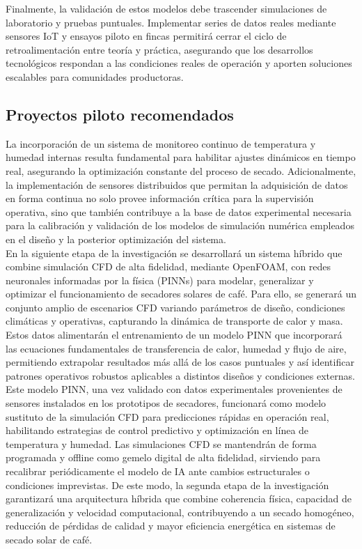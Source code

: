 \documentclass[12pt]{article}
\begin{document}
Finalmente, la validación de estos modelos debe trascender simulaciones de laboratorio y pruebas puntuales. Implementar series de datos reales mediante sensores IoT y ensayos piloto en fincas permitirá cerrar el ciclo de retroalimentación entre teoría y práctica, asegurando que los desarrollos tecnológicos respondan a las condiciones reales de operación y aporten soluciones escalables para comunidades productoras.




\subsection{Proyectos piloto recomendados}


La incorporación de un sistema de monitoreo continuo de temperatura y humedad internas resulta fundamental para habilitar ajustes dinámicos en tiempo real, asegurando la optimización constante del proceso de secado. Adicionalmente, la implementación de sensores distribuidos que permitan la adquisición de datos en forma continua no solo provee información crítica para la supervisión operativa, sino que también contribuye a la base de datos experimental necesaria para la calibración y validación de los modelos de simulación numérica empleados en el diseño y la posterior optimización del sistema.\\

En la siguiente etapa de la investigación se desarrollará un sistema híbrido que combine simulación CFD de alta fidelidad, mediante OpenFOAM, con redes neuronales informadas por la física (PINNs) para modelar, generalizar y optimizar el funcionamiento de secadores solares de café. Para ello, se generará un conjunto amplio de escenarios CFD variando parámetros de diseño, condiciones climáticas y operativas, capturando la dinámica de transporte de calor y masa. Estos datos alimentarán el entrenamiento de un modelo PINN que incorporará las ecuaciones fundamentales de transferencia de calor, humedad y flujo de aire, permitiendo extrapolar resultados más allá de los casos puntuales y así identificar patrones operativos robustos aplicables a distintos diseños y condiciones externas.\\

Este modelo PINN, una vez validado con datos experimentales provenientes de sensores instalados en los prototipos de secadores, funcionará como modelo sustituto de la simulación CFD para predicciones rápidas en operación real, habilitando estrategias de control predictivo y optimización en línea de temperatura y humedad. Las simulaciones CFD se mantendrán de forma programada y offline como gemelo digital de alta fidelidad, sirviendo para recalibrar periódicamente el modelo de IA ante cambios estructurales o condiciones imprevistas. De este modo, la segunda etapa de la investigación garantizará una arquitectura híbrida que combine coherencia física, capacidad de generalización y velocidad computacional, contribuyendo a un secado homogéneo, reducción de pérdidas de calidad y mayor eficiencia energética en sistemas de secado solar de café.
\end{document}
